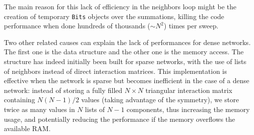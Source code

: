 The main reason for this lack of efficiency in the neighbors loop might be the creation of temporary \texttt{Bits} objects over the summations, killing the code performance when done hundreds of thousands ($\sim N^2$) times per sweep.

Two other related causes can explain the lack of performances for dense networks. The first one is the data structure and the other one is the memory access. The structure has indeed initially been built for sparse networks, with the use of lists of neighbors instead of direct interaction matrices. This implementation is effective when the network is sparse but becomes inefficient in the case of a dense network: instead of storing a fully filled $N \times N$ triangular interaction matrix containing $N \left(N-1\right)/2$ values (taking advantage of the symmetry), we store twice as many values in $N$ lists of $N-1$ components, thus increasing the memory usage, and potentially reducing the performance if the memory overflows the available RAM.
\nolinenumbers
